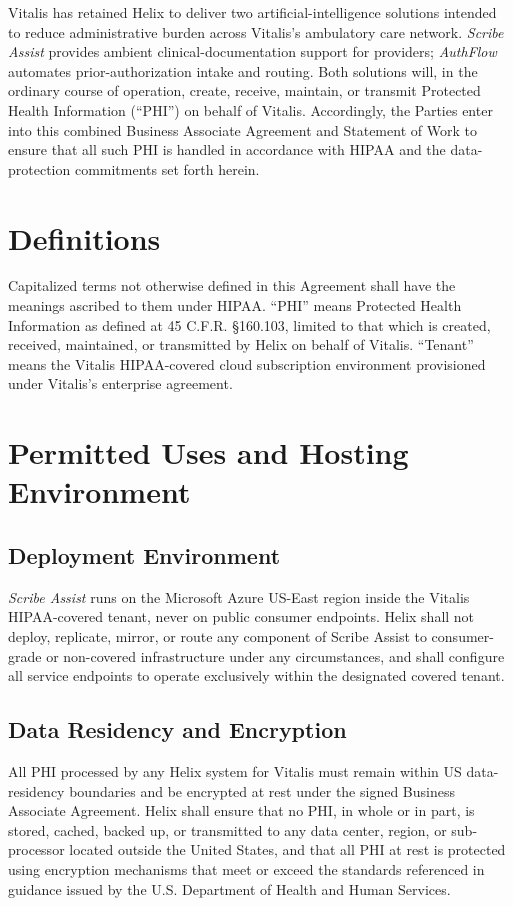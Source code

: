\documentclass[11pt]{article}
\begin{document}
Vitalis has retained Helix to deliver two artificial-intelligence solutions intended to reduce administrative burden across Vitalis's ambulatory care network. \textit{Scribe Assist} provides ambient clinical-documentation support for providers; \textit{AuthFlow} automates prior-authorization intake and routing. Both solutions will, in the ordinary course of operation, create, receive, maintain, or transmit Protected Health Information (``PHI'') on behalf of Vitalis. Accordingly, the Parties enter into this combined Business Associate Agreement and Statement of Work to ensure that all such PHI is handled in accordance with HIPAA and the data-protection commitments set forth herein.

\section{Definitions}

Capitalized terms not otherwise defined in this Agreement shall have the meanings ascribed to them under HIPAA. ``PHI'' means Protected Health Information as defined at 45 C.F.R. \S 160.103, limited to that which is created, received, maintained, or transmitted by Helix on behalf of Vitalis. ``Tenant'' means the Vitalis HIPAA-covered cloud subscription environment provisioned under Vitalis's enterprise agreement.

\section{Permitted Uses and Hosting Environment}

\subsection{Deployment Environment}
\textit{Scribe Assist} runs on the Microsoft Azure US-East region inside the Vitalis HIPAA-covered tenant, never on public consumer endpoints. Helix shall not deploy, replicate, mirror, or route any component of Scribe Assist to consumer-grade or non-covered infrastructure under any circumstances, and shall configure all service endpoints to operate exclusively within the designated covered tenant.

\subsection{Data Residency and Encryption}
All PHI processed by any Helix system for Vitalis must remain within US data-residency boundaries and be encrypted at rest under the signed Business Associate Agreement. Helix shall ensure that no PHI, in whole or in part, is stored, cached, backed up, or transmitted to any data center, region, or sub-processor located outside the United States, and that all PHI at rest is protected using encryption mechanisms that meet or exceed the standards referenced in guidance issued by the U.S. Department of Health and Human Services.
\end{document}
